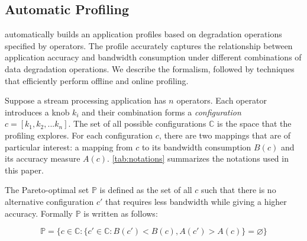 \subsection{Automatic Profiling}
\label{sec:automatic-profiling}

\sysname{} automatically builds an application profiles based on degradation
operations specified by \maybe{} operators. The profile accurately captures the
relationship between application accuracy and bandwidth consumption under
different combinations of data degradation operations. We describe the
formalism, followed by techniques that efficiently perform offline and online
profiling.

 Suppose a stream processing application has $n$
\maybe{} operators. Each operator introduces a knob $k_i$ and their combination
forms a \textit{configuration} $c = [k_{1}, k_{2}, ... k_{n}]$. The set of all
possible configurations $\mathbb{C}$ is the space that the profiling
explores. For each configuration $c$, there are two mappings that are of
particular interest: a mapping from $c$ to its bandwidth consumption $B(c)$ and
its accuracy measure $A(c)$. \autoref{tab:notations} summarizes the notations
used in this paper.

The Pareto-optimal set $\mathbb{P}$ is defined as the set of all $c$ such that
there is no alternative configuration $c'$ that requires less bandwidth while
giving a higher accuracy. Formally $\mathbb{P}$ is written as follows:

{\small \vspace{-1em}
  \begin{equation}
  \mathbb{P} = \{ c \in \mathbb{C} : \{ c' \in \mathbb{C}: B(c') < B(c),
  A(c') > A(c) \} = \varnothing\}
  \label{eq:pareto}
\end{equation}
}%

